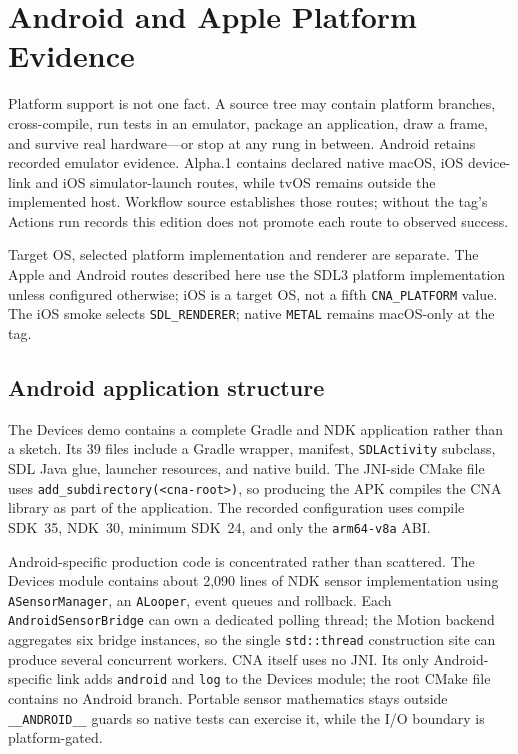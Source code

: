\chapter{Android and Apple Platform Evidence}
\label{ch:android-macos}
\label{ch:android-ndk}

Platform support is not one fact.  A source tree may contain platform branches, cross-compile,
run tests in an emulator, package an application, draw a frame, and survive real hardware---or
stop at any rung in between.  Android retains recorded emulator evidence.  Alpha.1 contains
declared native macOS, iOS device-link and iOS simulator-launch routes, while tvOS remains outside
the implemented host.  Workflow source establishes those routes; without the tag's Actions run
records this edition does not promote each route to observed success.

Target OS, selected platform implementation and renderer are separate.  The Apple and Android
routes described here use the SDL3 platform implementation unless configured otherwise; iOS is a
target OS, not a fifth \texttt{CNA\_PLATFORM} value.  The iOS smoke selects
\texttt{SDL\_RENDERER}; native \texttt{METAL} remains macOS-only at the tag.

\section{Android application structure}

The Devices demo contains a complete Gradle and NDK application rather than a sketch.  Its 39
files include a Gradle wrapper, manifest, \texttt{SDLActivity} subclass, SDL Java glue, launcher
resources, and native build.  The JNI-side CMake file uses
\texttt{add\_subdirectory(<cna-root>)}, so producing the APK compiles the CNA library as part of
the application.  The recorded configuration uses compile SDK~35, NDK~30, minimum SDK~24, and
only the \texttt{arm64-v8a} ABI.

Android-specific production code is concentrated rather than scattered. The Devices module
contains about 2,090 lines of NDK sensor implementation using \texttt{ASensorManager}, an
\texttt{ALooper}, event queues and rollback. Each \texttt{AndroidSensorBridge} can own a dedicated
polling thread; the Motion backend aggregates six bridge instances, so the single
\texttt{std::thread} construction site can produce several concurrent workers. CNA itself uses
no JNI. Its only Android-specific link adds \texttt{android} and \texttt{log} to the Devices
module; the root CMake file contains no Android branch. Portable sensor mathematics stays outside
\texttt{\_\_ANDROID\_\_} guards so native tests can exercise it, while the I/O boundary is
platform-gated.

